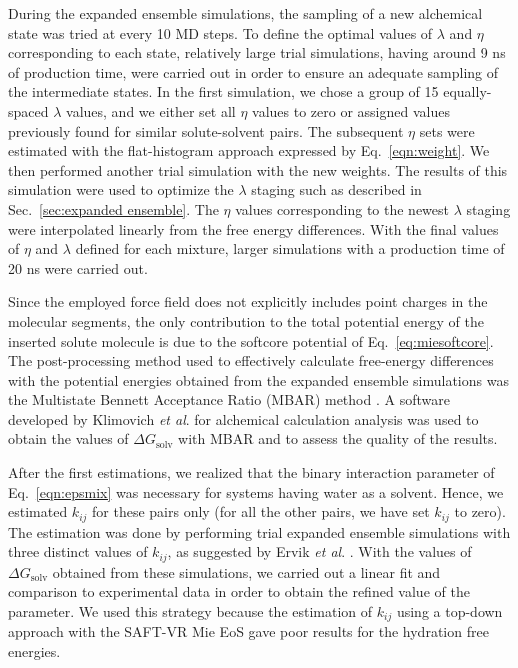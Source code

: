 \documentclass[final,12p,times,twocolumn]{elsarticle}
\begin{document}
	During the expanded ensemble simulations, the sampling of a new alchemical state was tried at every 10 MD steps. To define the optimal values of $\lambda$ and $\eta$ corresponding to each state, relatively large trial simulations, having around 9 ns of production time, were carried out in order to ensure an adequate sampling of the intermediate states. In the first simulation, we chose a group of 15 equally-spaced $\lambda$ values, and we either set all $\eta$ values to zero or assigned values previously found for similar solute-solvent pairs. The subsequent $\eta$ sets were estimated with the flat-histogram approach expressed by Eq.~\eqref{eqn:weight}. We then performed another trial simulation with the new weights. The results of this simulation were used to optimize the $\lambda$ staging such as described in Sec.~\ref{sec:expanded ensemble}. The $\eta$ values corresponding to the newest $\lambda$ staging were interpolated linearly from the free energy differences. With the final values of $\eta$ and $\lambda$ defined for each mixture, larger simulations with a production time of 20 ns were carried out.

	Since the employed force field does not explicitly includes point charges in the molecular segments, the only contribution to the total potential energy of the inserted solute molecule is due to the softcore potential of Eq.~\eqref{eq:miesoftcore}. The post-processing method used to effectively calculate free-energy differences with the potential energies obtained from the expanded ensemble simulations was the Multistate Bennett Acceptance Ratio (MBAR) method \cite{mbar}. A software developed by Klimovich \textit{et al}. \cite{klimovich} for alchemical calculation analysis was used to obtain the values of $\Delta G_\text{solv}$ with MBAR and to assess the quality of the results.

	After the first estimations, we realized that the binary interaction parameter of Eq.~\eqref{eqn:epsmix} was necessary for systems having water as a solvent. Hence, we estimated $k_{ij}$ for these pairs only (for all the other pairs, we have set $k_{ij}$ to zero). The estimation was done by performing trial expanded ensemble simulations with three distinct values of $k_{ij}$, as suggested by Ervik \textit{et al}. \cite{ervik20162}. With the values of $\Delta G_\text{solv}$ obtained from these simulations, we carried out a linear fit and comparison to experimental data \cite{P29900000291, doi:10.1021/ct050097l} in order to obtain the refined value of the parameter. We used this strategy because the estimation of $k_{ij}$ using a top-down approach with the SAFT-VR Mie EoS gave poor results for the hydration free energies.
\end{document}
